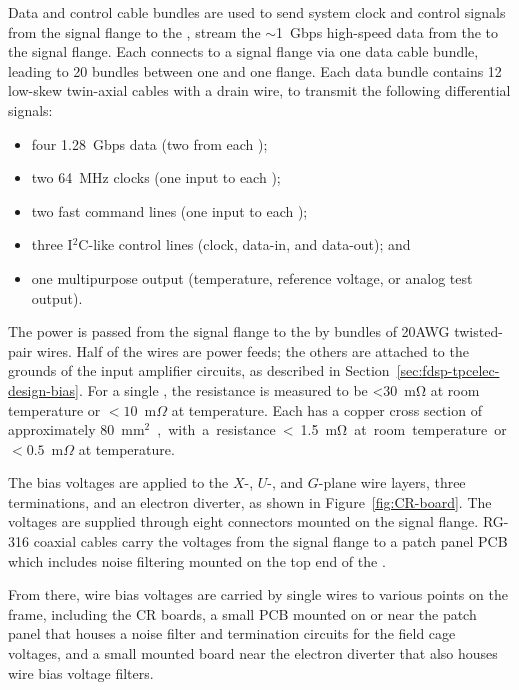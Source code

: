 Data and control cable bundles are used to send system clock and control signals from the 
signal flange to the , stream the $\sim$\SI{1}{Gbps} high-speed data from the  to the signal flange.  Each  
connects to a signal flange via one data cable bundle, leading to 20 bundles between one  and one flange.  Each data bundle contains 12 low-skew twin-axial cables with a drain wire, 
to transmit the following differential signals:
\begin{itemize}
    \item four \SI{1.28}{Gbps} data (two from each );
    \item two \SI{64}{MHz} clocks (one input to each );
    \item two fast command lines (one input to each );
    \item three I$^2$C-like control lines (clock, data-in, and data-out); and
    \item one multipurpose  output (temperature, reference voltage, or analog test output).
\end{itemize}

The  power is passed from the signal flange to the  by bundles of
20AWG twisted-pair wires. Half of the wires are power feeds; the others
are attached to the grounds of the input amplifier circuits, as described in Section~\ref{sec:fdsp-tpcelec-design-bias}.
For a single , the resistance is measured to be  <\SI{30}{\milli\ohm} at room temperature or $<10$~m$\Omega$ at 
\lar temperature. Each  has a copper cross section of approximately %
\SI{80}{mm$^2$}, with a 
resistance <\SI{1.5}{\milli\ohm} at room temperature or $<0.5$~m$\Omega$ at \lar temperature.

The bias voltages are applied to the $X$-, $U$-, and $G$-plane wire layers, three  terminations, 
and an electron diverter, as shown in Figure~\ref{fig:CR-board}. The voltages are supplied 
through eight  connectors mounted on the signal flange. RG-316 coaxial cables carry the voltages 
from the signal flange to a patch panel PCB which includes noise filtering mounted on the top 
end of the . 

From there, wire bias voltages are carried by single wires to 
various points on the  frame, including the CR boards, a small PCB mounted on or near 
the patch panel that houses a noise filter and termination circuits for the field cage voltages, and 
a small mounted board near the electron diverter that also houses wire bias voltage filters.

